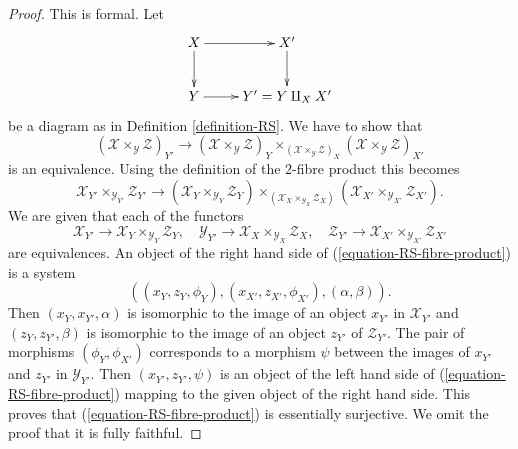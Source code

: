 \documentclass[10pt,a4paper]{amsart}
\theoremstyle{plain}
\theoremstyle{definition}
\theoremstyle{remark}
\numberwithin{equation}{subsection}
\begin{document}
\begin{proof}
This is formal. Let 
$$
\xymatrix{
X \ar[r] \ar[d] & X' \ar[d] \\
Y \ar[r] & Y' = Y \amalg_X X'
}
$$
be a diagram as in Definition \ref{definition-RS}. We have to show that
$$
(\mathcal{X} \times_{\mathcal{Y}} \mathcal{Z})_{Y'}
\longrightarrow
(\mathcal{X} \times_{\mathcal{Y}} \mathcal{Z})_Y
\times_{(\mathcal{X} \times_{\mathcal{Y}} \mathcal{Z})_X}
(\mathcal{X} \times_{\mathcal{Y}} \mathcal{Z})_{X'}
$$
is an equivalence. Using the definition of the $2$-fibre product
this becomes
\begin{equation}
\label{equation-RS-fibre-product}
\mathcal{X}_{Y'} \times_{\mathcal{Y}_{Y'}} \mathcal{Z}_{Y'}
\longrightarrow
(\mathcal{X}_Y \times_{\mathcal{Y}_Y} \mathcal{Z}_Y)
\times_{(\mathcal{X}_X \times_{\mathcal{Y}_X} \mathcal{Z}_X)}
(\mathcal{X}_{X'} \times_{\mathcal{Y}_{X'}} \mathcal{Z}_{X'}).
\end{equation}
We are given that each of the functors
$$
\mathcal{X}_{Y'} \to \mathcal{X}_Y \times_{\mathcal{Y}_Y} \mathcal{Z}_Y,
\quad
\mathcal{Y}_{Y'} \to \mathcal{X}_X \times_{\mathcal{Y}_X} \mathcal{Z}_X,
\quad
\mathcal{Z}_{Y'} \to
\mathcal{X}_{X'} \times_{\mathcal{Y}_{X'}} \mathcal{Z}_{X'}
$$
are equivalences. An object of the right hand side of
(\ref{equation-RS-fibre-product}) is a system
$$
((x_Y, z_Y, \phi_Y), (x_{X'}, z_{X'}, \phi_{X'}), (\alpha, \beta)).
$$
Then $(x_Y, x_{Y'}, \alpha)$ is isomorphic to the image of an object
$x_{Y'}$ in $\mathcal{X}_{Y'}$ and $(z_Y, z_{Y'}, \beta)$ is isomorphic
to the image of an object $z_{Y'}$ of $\mathcal{Z}_{Y'}$. The pair of
morphisms $(\phi_Y, \phi_{X'})$ corresponds to a morphism $\psi$
between the images of $x_{Y'}$ and $z_{Y'}$ in $\mathcal{Y}_{Y'}$.
Then $(x_{Y'}, z_{Y'}, \psi)$ is an object of the left hand side of
(\ref{equation-RS-fibre-product}) mapping to the given object of the
right hand side. This proves that (\ref{equation-RS-fibre-product}) is
essentially surjective. We omit the proof that it is fully faithful.
\end{proof}
\end{document}
